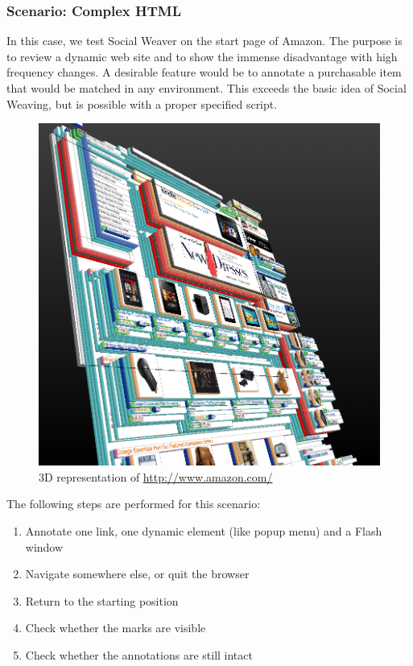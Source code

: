 \subsubsection{Scenario: Complex HTML}
In this case, we test Social Weaver on the start page of Amazon. The purpose is to review a dynamic web site and to show the immense disadvantage with high frequency changes. A desirable feature would be to annotate a purchasable item that would be matched in any environment. This exceeds the basic idea of Social Weaving, but is possible with a proper specified script. 

\begin{figure}\centering
		\includegraphics[width=13cm]{images/3d-amazon.png}
		\caption{3D representation of \url{http://www.amazon.com/}}
		\label{3d-amazon}
\end{figure} 

The following steps are performed for this scenario:
\begin{enumerate}
\item Annotate one link, one dynamic element (like popup menu) and a Flash window
\item Navigate somewhere else, or quit the browser
\item Return to the starting position
\item Check whether the marks are visible
\item Check whether the annotations are still intact
\end{enumerate}


